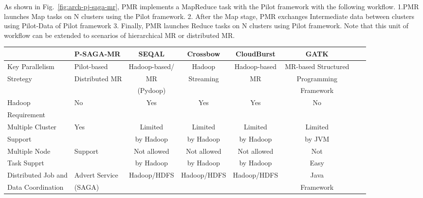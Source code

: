 \documentclass{sig-alternate}
\begin{document}
As shown in Fig.~\ref{fig:arch-pj-saga-mr}, PMR implements a MapReduce task with the Pilot framework\cite{pmr2012} with the following workflow. 1.PMR launches Map tasks on N clusters using the Pilot framework. 2. After the Map stage, PMR exchanges Intermediate data between clusters using Pilot-Data of Pilot framework  3. Finally, PMR launches Reduce tasks on N clusters using Pilot framework.  Note that this unit of workflow can be extended to scenarios of hierarchical MR or distributed MR\cite{pmr2012}.  

\begin{center}
\begin{table}[ht]
{\small
\hfill{}
\begin{tabular}{|l|l|c|c|c|c|c|c|}
\hline
  & \textbf{P-SAGA-MR}\cite{pmr2012} & \textbf{SEQAL}\cite{seal2011} & \textbf{Crossbow}\cite{langmead2009} & \textbf{CloudBurst}\cite{cloudburst} & \textbf{GATK}\cite{gatk} \\ \hline
 \hline 
Key Parallelism   & Pilot-based   &  Hadoop-based/  &  Hadoop   & Hadoop-based & MR-based Structured \\ 
Stretegy  & Distributed MR & MR  & Streaming  & MR & Programming  \\
& & (Pydoop) &  & & Framework  \\ \hline
  
Hadoop & No & Yes & Yes\footnote[1] & Yes & No \\ 
Requirement  & & & &  &\\ \hline  
    
Multiple  Cluster & Yes  & Limited   & Limited  & Limited  & Limited \\
Support &  & by Hadoop &  by Hadoop & by Hadoop  & by JVM   \\ \hline

Multiple Node & Support & Not allowed  & Not allowed  & Not allowed & Not  \\
Task Supprt &  & by Hadoop & by Hadoop & by Hadoop & Easy  \\ \hline
Distributed Job and  & Advert Service  & Hadoop/HDFS & Hadoop/HDFS & Hadoop/HDFS & Java \\ 
Data Coordination &(SAGA) &  & & & Framework\\ \hline



\end{tabular}}
\end{table}
\end{center}
\end{document}
